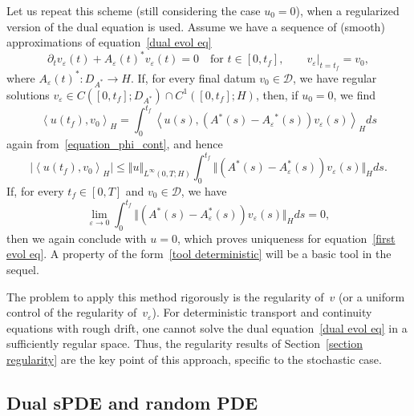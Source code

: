 \documentclass[a4paper,10pt]{article}
\newcommand\1{\mathbbm{1}}
\newcommand{\eps}{\varepsilon}
\numberwithin{equation}{section}
\begin{document}
Let us repeat this scheme (still considering the case $u_0=0$), when a regularized version of the dual equation is used. Assume we have a sequence of (smooth) approximations of equation~\eqref{dual evol eq}
\begin{equation*}
\partial_t v_{\eps} (t) +A_{\eps}(t)^{\ast} v_{\eps}(t) =0 \quad \text{for } t\in[0,t_{f}], 
\qquad v_{\eps}|_{t=t_{f}} = v_{0} ,
\end{equation*}
where $A_{\eps}(t)^{\ast} \colon D_{A^{\ast}}\rightarrow H$. If, for every final datum $v_{0}\in\mathcal{D}$, we have regular solutions $v_{\eps} \in C([0,t_{f}];D_{A^{\ast}}) \cap C^{1}([0,t_{f}];H)$, then, if $u_0=0$, we find
\begin{equation}
\left\langle u(t_{f}),v_{0}\right\rangle _{H}=\int_{0}^{t_{f} }\left\langle u(s)  ,(  A{}^{\ast}(s) - A_{\eps}{}^{\ast}(s) )  v_{\eps}(s)
\right\rangle _{H}ds  \label{duality formula determ}
\end{equation}
again from~\eqref{equation_phi_cont}, and hence
\begin{equation*}
\vert \left\langle u(t_{f}),v_{0}\right\rangle_{H} \vert \leq \Vert u\Vert_{L^{\infty}(0,T;H)} \int_{0}^{t_{f}} \Vert ( A^{\ast}(s) - A_{\eps}^{\ast}(s)) v_{\eps}(s) \Vert_{H}ds .
\end{equation*}
If, for every $t_{f}\in [0,T]$ and $v_{0}\in\mathcal{D}$, we have
\begin{equation}
\lim_{\eps\rightarrow0}\int_{0}^{t_{f}} \Vert ( A^{\ast}(s)  -A_{\eps}^{\ast}(s))
v_{\eps} (s) \Vert_{H}ds=0 \label{tool deterministic} ,
\end{equation}
then we again conclude with $u=0$, which proves uniqueness for equation~\eqref{first evol eq}. A property of the form~\eqref{tool deterministic} will be a basic tool in the sequel.

The problem to apply this method rigorously is the regularity of~$v$ (or a uniform control of the regularity of~$v_{\eps}$). For deterministic transport and continuity equations with rough drift, one cannot solve the dual equation~\eqref{dual evol eq} in a sufficiently regular space. Thus, the regularity results of Section~\ref{section regularity} are the key point of this approach, specific to the stochastic case.

\subsection{Dual sPDE and random PDE}
\end{document}
